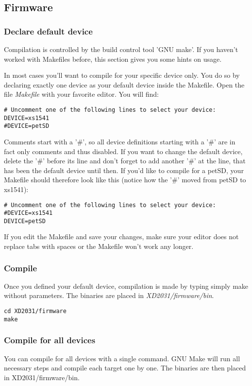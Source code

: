\subsection{Firmware}
\subsubsection{Declare default device}
Compilation is controlled by the build control tool 'GNU make'. If you haven't worked with Makefiles before,
this section gives you some hints on usage.

In most cases you'll want to compile for your specific device only. 
You do so by declaring exactly one device as your default device inside
the Makefile. Open the file \textit{Makefile} with your favorite editor.
You will find:

\clearpage
\begin{verbatim}
# Uncomment one of the following lines to select your device:
DEVICE=xs1541
#DEVICE=petSD
\end{verbatim}

Comments start with a '\#', so all device definitions starting with a '\#'
are in fact only comments and thus disabled. If you want to change the
default device, delete the '\#' before its line and don't forget to add
another '\#' at the line, that has been the default device until then.
If you'd like to compile for a petSD, your Makefile should therefore look
like this (notice how the '\#' moved from petSD to xs1541):

\begin{verbatim}
# Uncomment one of the following lines to select your device:
#DEVICE=xs1541
DEVICE=petSD
\end{verbatim}

If you edit the Makefile and save your changes, make sure your editor does 
not replace tabs with spaces or the Makefile won't work any longer.

\subsubsection{Compile}

Once you defined your default device, compilation is made by typing simply make without parameters. The binaries are placed in \textit{XD2031/firmware/bin}.

\begin{verbatim}
cd XD2031/firmware
make
\end{verbatim}

\subsubsection{Compile for all devices}
You can compile for all devices with a single command. 
GNU Make will run all necessary steps and compile each target one by one. The binaries are then placed in XD2031/firmware/bin.

